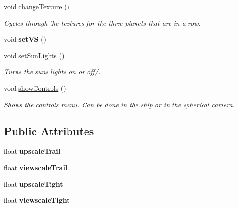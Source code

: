 \begin{DoxyCompactItemize}
\mbox{\label{class_graphics_engine_a8f792bd2dc9a07ee18115c1642247dd6}} 
void \hyperlink{class_graphics_engine_a8f792bd2dc9a07ee18115c1642247dd6}{change\+Texture} ()
\begin{DoxyCompactList}\small\item\em Cycles through the textures for the three planets that are in a row. \end{DoxyCompactList}\item 
\mbox{\label{class_graphics_engine_a0807c26da0307a7d779c1b1468471faf}} 
void {\bfseries set\+VS} ()
\item 
\mbox{\label{class_graphics_engine_a95c3ad16e6fcc0ffe08d8be2672d8f9d}} 
void \hyperlink{class_graphics_engine_a95c3ad16e6fcc0ffe08d8be2672d8f9d}{set\+Sun\+Lights} ()
\begin{DoxyCompactList}\small\item\em Turns the sun\textquotesingle{}s lights on or off/. \end{DoxyCompactList}\item 
\mbox{\label{class_graphics_engine_a2b7d95e078de2945905a6e94158c6f1d}} 
void \hyperlink{class_graphics_engine_a2b7d95e078de2945905a6e94158c6f1d}{show\+Controls} ()
\begin{DoxyCompactList}\small\item\em Shows the controls menu. Can be done in the ship or in the spherical camera. \end{DoxyCompactList}\end{DoxyCompactItemize}
\subsection*{Public Attributes}
\begin{DoxyCompactItemize}
\item 
\mbox{\label{class_graphics_engine_aacd9840f4fbb47add13a74c46c680ae7}} 
float {\bfseries upscale\+Trail}
\item 
\mbox{\label{class_graphics_engine_a2d0f8da2902312264f93aa854cabd0a4}} 
float {\bfseries viewscale\+Trail}
\item 
\mbox{\label{class_graphics_engine_a79f15b0bd7e2b3a2aeea743fddec5070}} 
float {\bfseries upscale\+Tight}
\item 
\mbox{\label{class_graphics_engine_a73d6be06ba5f0836372ffe930b3c5072}} 
float {\bfseries viewscale\+Tight}
\end{DoxyCompactItemize}


